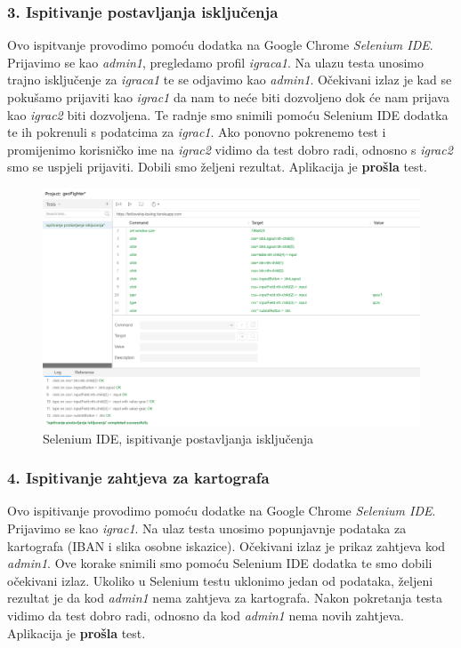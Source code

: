 			\subsubsection{3. Ispitivanje postavljanja isključenja}
			
				{Ovo ispitvanje provodimo pomoću dodatka na Google Chrome \emph{Selenium IDE}. Prijavimo se kao \emph{admin1}, pregledamo profil \emph{igraca1}. Na ulazu testa unosimo trajno isključenje za \emph{igraca1} te se odjavimo kao \emph{admin1}. Očekivani izlaz je kad se pokušamo prijaviti kao \emph{igrac1} da nam to neće biti dozvoljeno dok će nam prijava kao \emph{igrac2} biti dozvoljena. Te radnje smo snimili pomoću Selenium IDE dodatka te ih pokrenuli s podatcima za \emph{igrac1}. Ako ponovno pokrenemo test i promijenimo korisničko ime na \emph{igrac2} vidimo da test dobro radi, odnosno s \emph{igrac2} smo se uspjeli prijaviti. Dobili smo željeni rezultat. Aplikacija je \textbf{prošla} test.}
					
					\begin{figure}[H]
						\includegraphics[width=\textwidth]{slike/SeleniumIDE_test1} 
						\centering
						\caption{Selenium IDE, ispitivanje postavljanja isključenja}
						\label{}
					\end{figure}
				\eject
			\subsubsection{4. Ispitivanje zahtjeva za kartografa}
			
				{Ovo ispitivanje provodimo pomoću dodatke na Google Chrome \emph{Selenium IDE}. Prijavimo se kao \emph{igrac1}. Na ulaz testa unosimo popunjavnje podataka za kartografa (IBAN i slika osobne iskazice). Očekivani izlaz je prikaz zahtjeva kod \emph{admin1}. Ove korake snimili smo pomoću Selenium IDE dodatka te smo dobili očekivani izlaz. Ukoliko u Selenium testu uklonimo jedan od podataka, željeni rezultat je da kod \emph{admin1} nema zahtjeva za kartografa. Nakon pokretanja testa vidimo da test dobro radi, odnosno da kod \emph{admin1} nema novih zahtjeva. Aplikacija je \textbf{prošla} test. }
					
